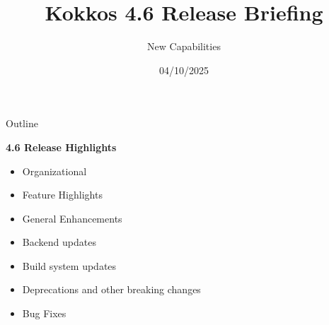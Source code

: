 
\usepackage{tikz}
\graphicspath{{4_6/figures/}}

\def\sandid{SANDXXXX PE}

\title{Kokkos 4.6 Release Briefing}

\author{New Capabilities}

\date{04/10/2025}





\begin{frame}
  \titlepage
\end{frame}


\begin{frame}[fragile]{Outline}

  \textbf{4.6 Release Highlights}

  \begin{itemize}
    \item{Organizational}
    \item{Feature Highlights}
    \item{General Enhancements}
    \item{Backend updates}
    \item{Build system updates}
    \item{Deprecations and other breaking changes}
    \item{Bug Fixes}
  \end{itemize}

\end{frame}

